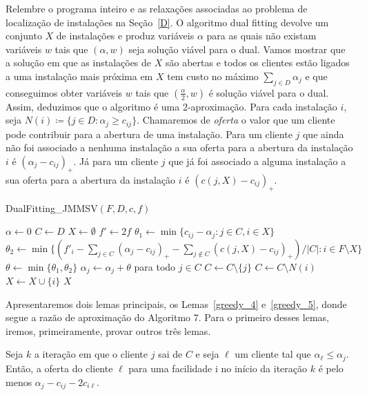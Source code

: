 Relembre o programa inteiro e as relaxações associadas ao problema de localização de instalações na Seção~\ref{D}. 
O algoritmo dual fitting devolve um conjunto $X$ de instalações e produz variáveis $\alpha$ para as quais não existam variáveis $w$ tais que $(\alpha,w)$ seja solução viável para o dual. 
Vamos mostrar que a solução em que as instalações de $X$ são abertas e todos os clientes estão ligados a uma instalação mais próxima em $X$ tem custo no máximo $\sum_{j \in D} \alpha_j$ e que conseguimos obter variáveis $w$ tais que $(\frac{\alpha}{2},w)$ é solução viável para o dual. 
Assim, deduzimos que o algoritmo é uma 2-aproximação. 
Para cada instalação $i$, seja $N(i) \coloneqq \{j \in D: \alpha_j \geq c_{ij}\}$. Chamaremos de \emph{oferta} o valor que um cliente pode contribuir para a abertura de uma instalação. Para um cliente $j$ que ainda não foi associado a nenhuma instalação a sua oferta para a abertura da instalação $i$ é $(\alpha_j - c_{ij})_+$. Já para um cliente $j$ que já foi associado a alguma instalação a sua oferta para a abertura da instalação $i$ é $(c(j,X) - c_{ij})_+$.

\begin{algorithm}
    \caption{DualFitting\_JMMSV$(F,D,c,f)$}
    \begin{algorithmic}[1]
    \State $\alpha \gets 0$
    \State $C \gets D$
    \State $X \gets \emptyset$
    \State $f' \gets 2f$
    \State $\theta_1 \gets \min\{c_{ij} - \alpha_j:j \in C,i\in X\}$
    \State $\theta_2 \gets \min\{(f'_i - \sum_{j \in C}(\alpha_j - c_{ij})_+ - \sum_{j \not \in C}(c(j,X) - c_{ij})_+)/|C|: i \in F \setminus X\}$
    \State $\theta \gets \min\{\theta_1,\theta_2\}$
    \State $\alpha_j \gets \alpha_j + \theta$ para todo $j \in C$
    \State $C \gets C \setminus \{j\}$
    \EndIf
    \State $C \gets C\setminus N(i)$
    \State $X \gets X \cup \{i\}$
    \EndIf
    \EndWhile
    \State \Return $X$
    \end{algorithmic}
\end{algorithm}
Apresentaremos dois lemas principais, os Lemas~\ref{greedy_4} e~\ref{greedy_5}, donde segue a razão de aproximação do Algoritmo 7.
Para o primeiro desses lemas, iremos, primeiramente, provar outros três lemas.

\begin{lemma}
    \label{upbound_bid}
    Seja $k$ a iteração em que o cliente $j$ sai de $C$ e seja $\ell$ um cliente tal que $\alpha_\ell \leq \alpha_j$. Então, a oferta do cliente $\ell$ para uma facilidade i no início da iteração $k$ é pelo menos $\alpha_j - c_{ij} - 2c_{i\ell}$.
\end{lemma}

